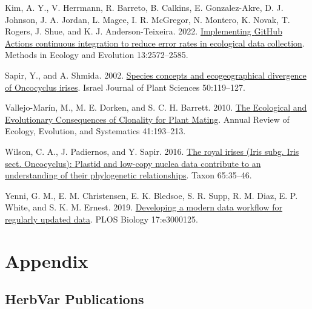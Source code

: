 \documentclass[
  letterpaper,
  DIV=11,
  numbers=noendperiod]{scrreprt}
\newlength{\cslhangindent}
\newenvironment{CSLReferences}[2] %
 {\begin{list}{}{%
  \setlength{\itemindent}{0pt}
  \setlength{\leftmargin}{0pt}
  \setlength{\parsep}{0pt}
  \ifodd #1
   \setlength{\leftmargin}{\cslhangindent}
   \setlength{\itemindent}{-1\cslhangindent}
  \fi
  \setlength{\itemsep}{#2\baselineskip}}}
 {\end{list}}
\begin{document}
\begin{CSLReferences}{1}{0}
Kim, A. Y., V. Herrmann, R. Barreto, B. Calkins, E. Gonzalez-Akre, D. J.
Johnson, J. A. Jordan, L. Magee, I. R. McGregor, N. Montero, K. Novak,
T. Rogers, J. Shue, and K. J. Anderson-Teixeira. 2022.
\href{https://doi.org/10.1111/2041-210X.13982}{Implementing {GitHub
Actions} continuous integration to reduce error rates in ecological data
collection}. Methods in Ecology and Evolution 13:2572--2585.

Sapir, Y., and A. Shmida. 2002.
\href{https://doi.org/10.1560/DJXH-QX0M-5P0H-DLMW}{Species concepts and
ecogeographical divergence of {Oncocyclus} irises}. Israel Journal of
Plant Sciences 50:119--127.

Vallejo-Marín, M., M. E. Dorken, and S. C. H. Barrett. 2010.
\href{https://doi.org/10.1146/annurev.ecolsys.110308.120258}{The
{Ecological} and {Evolutionary Consequences} of {Clonality} for {Plant
Mating}}. Annual Review of Ecology, Evolution, and Systematics
41:193--213.

Wilson, C. A., J. Padiernos, and Y. Sapir. 2016.
\href{https://doi.org/10.12705/651.3}{The royal irises ({Iris} subg.
{Iris} sect. {Oncocyclus}): {Plastid} and low-copy nuclea data
contribute to an understanding of their phylogenetic relationships}.
Taxon 65:35--46.

Yenni, G. M., E. M. Christensen, E. K. Bledsoe, S. R. Supp, R. M. Diaz,
E. P. White, and S. K. M. Ernest. 2019.
\href{https://doi.org/10.1371/journal.pbio.3000125}{Developing a modern
data workflow for regularly updated data}. PLOS Biology 17:e3000125.

\end{CSLReferences}

\part{Appendix}

\chapter*{HerbVar Publications}\label{herbvar-publications}

\end{document}
